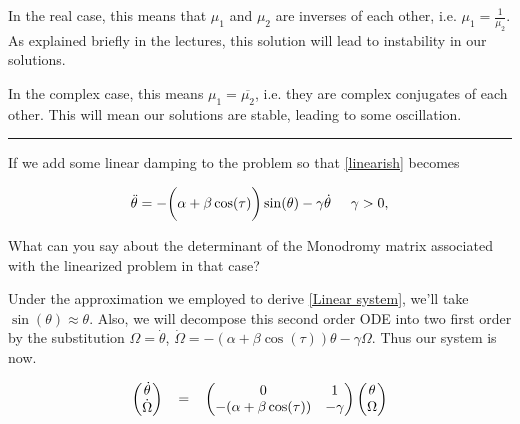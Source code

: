 \documentclass[12pt]{article}
\newcommand{\jump}{\vspace{5mm}}
\begin{document}
\begin{enumerate}[]
\begin{solution}
            In the real case, this means that $\mu_1$ and $\mu_2$ are inverses of each other, i.e. $\mu_1 = \frac{1}{\mu_2}$. As explained briefly in the lectures, this solution will lead to instability in our solutions. 

            In the complex case, this means $\mu_1 = \overline{\mu_2}$, i.e. they are complex conjugates of each other. This will mean our solutions are stable, leading to some oscillation.
        \end{solution}

        \jump
        \hrule
        \jump
        If we add some linear damping to the problem so that \ref{linearish} becomes

        \begin{align}
            \ddot{\theta} = -\bigg(    \alpha + \beta\cos(\tau)\bigg)\sin(\theta) - \gamma\dot{\theta}     \hspace{5mm} \gamma > 0,
        \end{align}

        What can you say about the determinant of the Monodromy matrix associated with the linearized problem in that case?

        \jump
        \begin{solution}

            Under the approximation we employed to derive \ref{Linear system}, we'll take $\sin(\theta) \approx \theta$. Also, we will decompose this second order ODE into two first order by the substitution $\Omega = \dot{\theta}$, $\dot{\Omega} = -(\alpha + \beta\cos(\tau))\theta - \gamma \Omega$. Thus our system is now.

            \begin{align}
                \begin{pmatrix}
                    \dot{\theta} \\
                    \dot{\Omega}
                \end{pmatrix}
                \hspace{3mm}
                = 
                \hspace{3mm}
                \begin{pmatrix}
                    0    &1 \\
                    -(\alpha + \beta\cos(\tau)) &-\gamma
                \end{pmatrix}
                \begin{pmatrix}
                    \theta  \\
                    \Omega
                \end{pmatrix}
                \label{damplinearsystem}
            \end{align}


\end{solution}
\end{enumerate}
\end{document}
